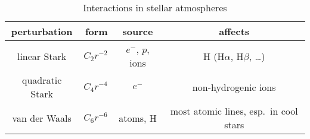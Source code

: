 \begin{table}[htbp]
\caption{Interactions in stellar atmospheres}\label{t.perturbers}
\begin{tabular}{crcc}
\hline
perturbation & form & source & affects\\
\hline\hline
linear Stark & $C_{2} r^{-2}$ & $e^{-}$, $p$, ions & H (H$\alpha$, H$\beta$, \ldots)\\
quadratic Stark & $C_{4} r^{-4}$ & $e^{-}$ & non-hydrogenic ions\\
van der Waals & $C_{6}r^{-6}$ & atoms, H & most atomic lines, esp.\ in cool stars\\
\hline
\end{tabular}
\end{table}



